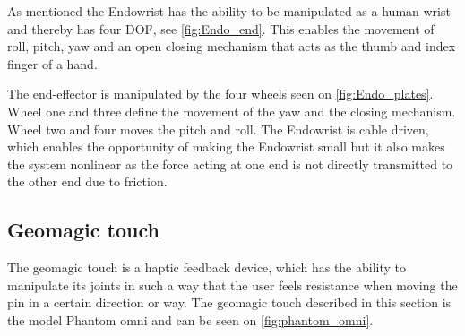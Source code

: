 \documentclass[conference]{IEEEtran}
\begin{document}
As mentioned the Endowrist has the ability to be manipulated as a human wrist and thereby has four DOF, see \ref{fig:Endo_end}. This enables the movement of roll, pitch, yaw and an open closing mechanism that acts as the thumb and index finger of a hand. 

The end-effector is manipulated by the four wheels seen on \ref{fig:Endo_plates}. Wheel one and three define the movement of the yaw and the closing mechanism. Wheel two and four moves the pitch and roll. The Endowrist is cable driven, which enables the opportunity of making the Endowrist small but it also makes the system nonlinear as the force acting at one end is not directly transmitted to the other end due to friction. 

\subsection{Geomagic touch}
The geomagic touch is a haptic feedback device, which has the ability to manipulate its joints in such a way that the user feels resistance when moving the pin in a certain direction or way. 
The geomagic touch described in this section is the model Phantom omni and can be seen on \ref{fig:phantom_omni}.
\end{document}
